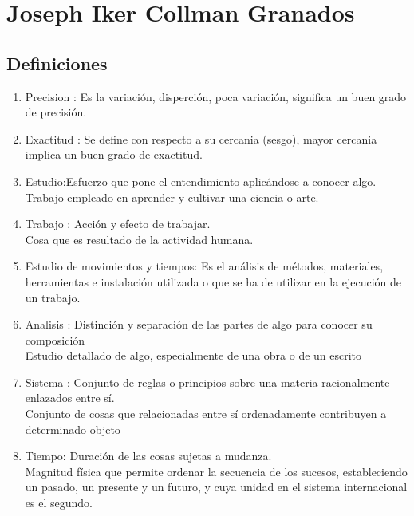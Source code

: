 \section{Joseph Iker Collman Granados}
\subsection{Definiciones}

\begin{enumerate}
    \item Precision : Es la variación, disperción, poca variación, significa un buen grado de precisión.

    \item Exactitud : Se define con respecto a su cercania (sesgo), mayor cercania implica un buen grado de exactitud.

    \item Estudio:Esfuerzo que pone el entendimiento aplicándose a conocer algo.
    \\Trabajo empleado en aprender y cultivar una ciencia o arte.
    
    \item Trabajo : Acción y efecto de trabajar.
    \\Cosa que es resultado de la actividad humana.
    
    \item Estudio de movimientos y tiempos: Es el análisis de métodos, materiales, herramientas e instalación utilizada o que se ha de utilizar en la ejecución de un trabajo.
    
    \item Analisis : Distinción y separación de las partes de algo para conocer su composición
    \\ Estudio detallado de algo, especialmente de una obra o de un escrito
    
    \item Sistema : Conjunto de reglas o principios sobre una materia racionalmente enlazados entre sí.
    \\Conjunto de cosas que relacionadas entre sí ordenadamente contribuyen a determinado objeto
    
    \item Tiempo: Duración de las cosas sujetas a mudanza.
     \\Magnitud física que permite ordenar la secuencia de los sucesos, estableciendo un pasado, un presente y un futuro, y cuya unidad en el sistema internacional es el segundo.
     

\end{enumerate}
